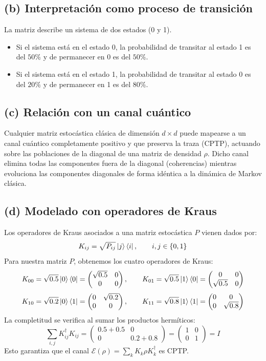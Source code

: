 \documentclass[12pt,a4paper]{article}
\begin{document}
\subsection{(b) Interpretación como proceso de transición}
La matriz describe un sistema de dos estados (0 y 1).
\begin{itemize}
  \item Si el sistema está en el estado 0, la probabilidad de transitar al estado 1 es del \(50\%\) y de permanecer en 0 es del \(50\%\).
  \item Si el sistema está en el estado 1, la probabilidad de transitar al estado 0 es del \(20\%\) y de permanecer en 1 es del \(80\%\).
\end{itemize}

\subsection{(c) Relación con un canal cuántico}
Cualquier matriz estocástica clásica de dimensión \(d \times d\) puede mapearse a un canal cuántico completamente positivo y que preserva la traza (CPTP), actuando sobre las poblaciones de la diagonal de una matriz de densidad \(\rho\). Dicho canal elimina todas las componentes fuera de la diagonal (coherencias) mientras evoluciona las componentes diagonales de forma idéntica a la dinámica de Markov clásica.

\subsection{(d) Modelado con operadores de Kraus}
Los operadores de Kraus asociados a una matriz estocástica \(P\) vienen dados por:
\[
K_{ij} = \sqrt{P_{ij}} \ket{j}\bra{i}, \qquad i,j \in \{0, 1\}
\]
Para nuestra matriz \(P\), obtenemos los cuatro operadores de Kraus:
\[
K_{00} = \sqrt{0.5}\ket{0}\bra{0} = \begin{pmatrix} \sqrt{0.5} & 0 \\ 0 & 0 \end{pmatrix}, \qquad K_{01} = \sqrt{0.5}\ket{1}\bra{0} = \begin{pmatrix} 0 & 0 \\ \sqrt{0.5} & 0 \end{pmatrix}
\]
\[
K_{10} = \sqrt{0.2}\ket{0}\bra{1} = \begin{pmatrix} 0 & \sqrt{0.2} \\ 0 & 0 \end{pmatrix}, \qquad K_{11} = \sqrt{0.8}\ket{1}\bra{1} = \begin{pmatrix} 0 & 0 \\ 0 & \sqrt{0.8} \end{pmatrix}
\]
La completitud se verifica al sumar los productos hermíticos:
\[
\sum_{i,j} K_{ij}^\dagger K_{ij} = \begin{pmatrix} 0.5+0.5 & 0 \\ 0 & 0.2+0.8 \end{pmatrix} = \begin{pmatrix} 1 & 0 \\ 0 & 1 \end{pmatrix} = I
\]
Esto garantiza que el canal \(\mathcal{E}(\rho) = \sum_k K_k \rho K_k^\dagger\) es CPTP.
\end{document}
